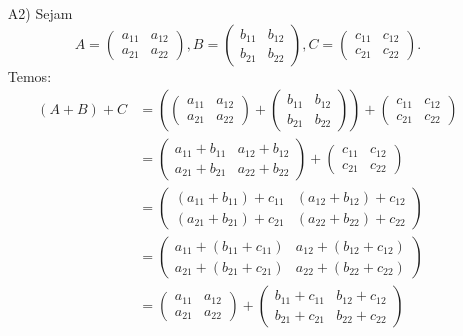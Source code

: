 \documentclass[12pt]{exam}
\begin{document}
\begin{itemize}
        \item[A2)] Sejam
        \[
        A = \begin{pmatrix} a_{11} & a_{12}\\a_{21} & a_{22}\end{pmatrix},
        B = \begin{pmatrix} b_{11} & b_{12}\\b_{21} & b_{22}\end{pmatrix},
        C = \begin{pmatrix} c_{11} & c_{12}\\c_{21} & c_{22}\end{pmatrix}.
        \]
        Temos:
        \begin{align*}
            (A + B) + C & = \left(\begin{pmatrix} a_{11} & a_{12}\\a_{21} & a_{22}\end{pmatrix} +
            \begin{pmatrix} b_{11} & b_{12}\\b_{21} & b_{22}\end{pmatrix}\right) +
            \begin{pmatrix} c_{11} & c_{12}\\c_{21} & c_{22}\end{pmatrix}
            \\ &= \begin{pmatrix} a_{11} + b_{11} & a_{12} + b_{12}\\a_{21} + b_{21} & a_{22} + b_{22}\end{pmatrix} +
            \begin{pmatrix} c_{11} & c_{12}\\c_{21} & c_{22}\end{pmatrix}
            \\ &= \begin{pmatrix} (a_{11} + b_{11}) + c_{11} & (a_{12} + b_{12}) + c_{12}\\(a_{21} + b_{21}) + c_{21} & (a_{22} + b_{22}) + c_{22}\end{pmatrix}
            \\ &= \begin{pmatrix} a_{11} + (b_{11} + c_{11}) & a_{12} + (b_{12} + c_{12})\\a_{21} + (b_{21} + c_{21}) & a_{22} + (b_{22} + c_{22})\end{pmatrix}
            \\ &= \begin{pmatrix} a_{11} & a_{12}\\a_{21} & a_{22}\end{pmatrix} + \begin{pmatrix} b_{11} + c_{11} & b_{12} + c_{12}\\b_{21} + c_{21} & b_{22} + c_{22}\end{pmatrix}

\end{align*}
\end{itemize}
\end{document}
